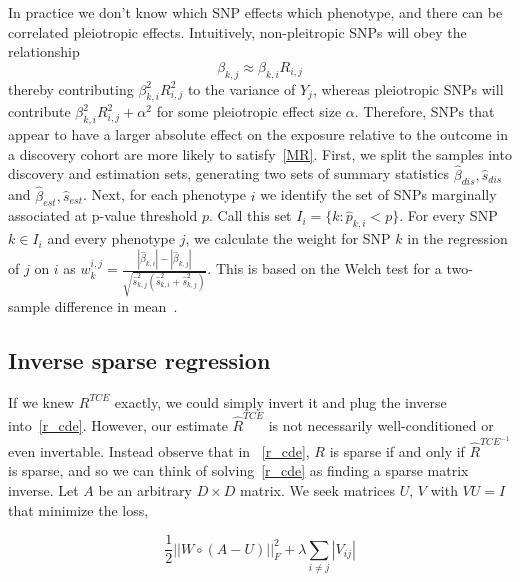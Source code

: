 \documentclass{article}
\begin{document}
In practice we don't know which SNP effects which phenotype,
and there can be correlated pleiotropic effects.
Intuitively, non-pleitropic SNPs will obey the relationship
\begin{equation}\label{MR}
\beta_{k,j} \approx \beta_{k,i} R_{i,j}
\end{equation}
thereby contributing
$\beta_{k, i}^2 R_{i, j}^2$ to the variance of $Y_j$, whereas
pleiotropic SNPs will contribute $\beta_{k, i}^2 R_{i, j}^2 + \alpha^2$
for some pleiotropic effect size $\alpha$. Therefore, SNPs that appear to
have a larger absolute effect on the exposure relative to the outcome in a discovery 
cohort are more likely to satisfy~\eqref{MR}.
 First, we split the samples
 into discovery and estimation sets, generating
two sets of summary statistics $\hat{\beta}_{dis}, \hat{s}_{dis}$ and
$\hat{\beta}_{est}, \hat{s}_{est}$. Next, for each
phenotype $i$ we identify the set of SNPs marginally associated at p-value threshold $p$.
Call this set $I_i = \{k: \hat{p}_{k, i} < p\}$. For every SNP $k \in I_i$ and
every phenotype $j$, we calculate the  weight for SNP $k$ in the regression of $j$ on $i$ as
$w^{i,j}_k = \frac{|\hat{\beta}_{k, i}| - |\hat{\beta}_{k, j}|}
  {\sqrt{\hat{s}_{k,j}^2 (\hat{s}^2_{k, i} + \hat{s}^2_{k, j})}}$. This
  is based on the Welch test for a two-sample difference in mean~\cite{Welch1947}.
  
\subsection{Inverse sparse regression}
If we knew $R^{TCE}$ exactly, we could simply invert it and plug the inverse
into~\eqref{r_cde}. However, our estimate $\hat{R}^{TCE}$ is not necessarily
well-conditioned or even invertable. Instead observe that in ~\eqref{r_cde}, $R$ is
sparse if and only if $\hat{R}^{TCE^{-1}}$ is sparse, and so we can think of
solving~\eqref{r_cde} as finding a sparse matrix inverse. Let $A$ be an arbitrary $D\times D$
matrix. We seek matrices $U$, $V$ with $VU=I$ that minimize the loss,

\begin{equation}
\frac{1}{2} ||W \circ (A - U)||_F^2 + \lambda \sum_{i\neq j}|V_{ij}|
\end{equation}
\end{document}
